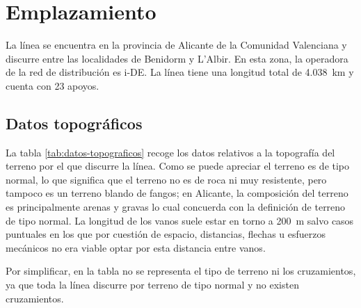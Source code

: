 \section{Emplazamiento}
\label{sec:md-emplazamiento}
La línea se encuentra en la provincia de Alicante de la Comunidad Valenciana y discurre entre las localidades de Benidorm y L'Albir. En esta zona, la operadora de la red de distribución es \ac{i-DE}.
La línea tiene una longitud total de \SI{4.038}{km} y cuenta con 23 apoyos.
\subsection{Datos topográficos}
\label{subsec:md-topografia}
La tabla \ref{tab:datos-topograficos} recoge los datos relativos a la topografía del terreno por el que discurre la línea. Como se puede apreciar el terreno es de tipo normal, lo que significa que el terreno no es de roca ni muy resistente, pero tampoco es un terreno blando de fangos; en Alicante, la composición del terreno es principalmente arenas y gravas lo cual concuerda con la definición de terreno de tipo normal. La longitud de los vanos suele estar en torno a \SI{200}{\meter} salvo casos puntuales en los que por cuestión de espacio, distancias, flechas u esfuerzos mecánicos no era viable optar por esta distancia entre vanos.

Por simplificar, en la tabla no se representa el tipo de terreno ni los cruzamientos, ya que toda la línea discurre por terreno de tipo normal y no existen cruzamientos.

